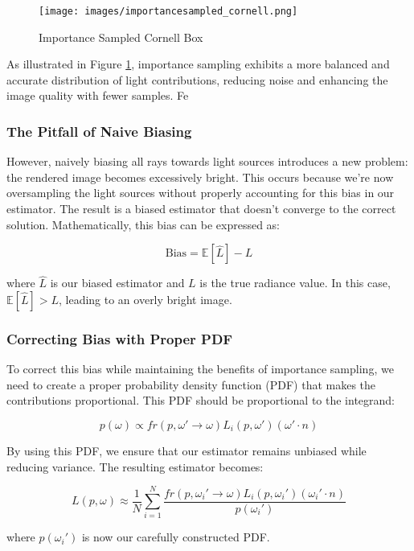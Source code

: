 \documentclass[12pt]{article}
\begin{document}
\begin{figure}[H]
    \centering
    \texttt{[image: images/importancesampled\_cornell.png]}
    \caption{Importance Sampled Cornell Box}
    \label{fig:importancesampled}
\end{figure}

As illustrated in Figure \ref{fig:importancesampled}, importance sampling exhibits a more balanced and accurate distribution of light contributions, reducing noise and enhancing the image quality with fewer samples.
Fe

\subsubsection{The Pitfall of Naive Biasing}

However, naively biasing all rays towards light sources introduces a new problem: the rendered image becomes excessively bright. This occurs because we're now oversampling the light sources without properly accounting for this bias in our estimator. The result is a biased estimator that doesn't converge to the correct solution. Mathematically, this bias can be expressed as:

\[
    \text{Bias} = \mathbb{E}[\hat{L}] - L
\]

where \( \hat{L} \) is our biased estimator and \( L \) is the true radiance value. In this case, \( \mathbb{E}[\hat{L}] > L \), leading to an overly bright image.

\subsubsection{Correcting Bias with Proper PDF}

To correct this bias while maintaining the benefits of importance sampling, we need to create a proper probability density function (PDF) that makes the contributions proportional. This PDF should be proportional to the integrand:

\[
    p(\omega) \propto fr(p, \omega' \to \omega) L_i(p, \omega') (\omega' \cdot n)
\]

By using this PDF, we ensure that our estimator remains unbiased while reducing variance. The resulting estimator becomes:

\[
    L(p, \omega) \approx \frac{1}{N} \sum_{i=1}^N \frac{fr(p, \omega_i' \to \omega) L_i(p, \omega_i') (\omega_i' \cdot n)}{p(\omega_i')}
\]

where \( p(\omega_i') \) is now our carefully constructed PDF.
\end{document}
